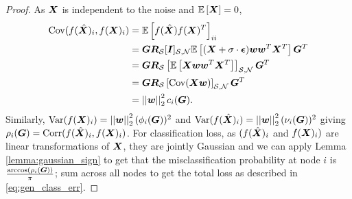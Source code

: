 \begin{proof}
    As $\bm{X}$ is independent to the noise and $\expect{\matr{X}}=0$,
    \begin{align}
        \text{Cov}(f(\hat{\vect{X}})_{i}, f({\vect{X}})_{i}) &= \expect{f(\hat{\vect{X}})f({\vect{X}})^{T}}_{ii} \\
        &= \matr{G}\matr{R}_{\set{S}}\matrsub[S,N]{I}\expect{(\matr{X} + \sigma \cdot \vect{\epsilon})\vect{w}\vect{w}^{T}\matr{X}^{T}}\matr{G}^{T} \\
        &= \matr{G}\matr{R}_{\set{S}}\msubgen[\set{S},\set{N}]{\expect{\matr{X} \vect{w}\vect{w}^{T}\matr{X}^{T}}}\matr{G}^{T} \\
        &= \matr{G}\matr{R}_{\set{S}}\msubgen[\set{S},\set{N}]{\text{Cov}(\matr{X}\vect{w})}\matr{G}^{T} \\
        &= \sqnormvec{\vect{w}}c_{i}(\matr{G}).
    \end{align}
    Similarly, $\text{Var}(f(\bm{X})_{i}) = \left\lvert\left\lvert\bm{w}\right\rvert\right\rvert^{2}_{2}(\phi_{i}(\bm{G}))^{2}$ and  $\text{Var}(f(\hat{\bm{X}})_{i}) = \left\lvert\left\lvert\bm{w}\right\rvert\right\rvert^{2}_{2}(\nu_{i}(\bm{G}))^{2}$ giving $\rho_{i}(\bm{G}) = \text{Corr}(f(\hat{\bm{X}})_{i}, f({\bm{X}})_{i})$. For classification loss, as $(f(\hat{\bm{X}})_{i}$ and $f({\bm{X}})_{i})$ are linear transformations of $\bm{X}$, they are jointly Gaussian and we can apply Lemma \ref{lemma:gaussian_sign} to get that the misclassification probability at node $i$ is $\frac{\text{arccos}(\rho_{i}(\bm{G}))}{\pi}$; sum across all nodes to get the total loss as described in \eqref{eq:gen_class_err}. 
    

\end{proof}
